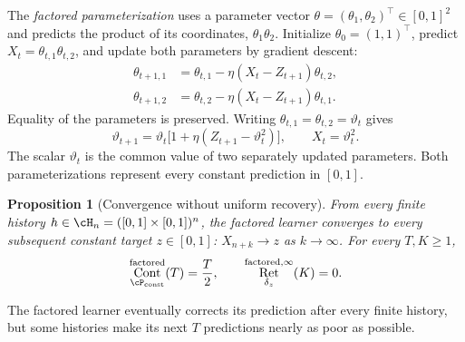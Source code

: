 \documentclass[11pt,twoside]{article}
\newtheorem{proposition}[theorem]{Proposition}
\theoremstyle{definition}
\theoremstyle{remark}
\DeclareMathOperator{\Cont}{Cont}
\DeclareMathOperator{\Ret}{Ret}
\begin{document}
The \emph{factored parameterization} uses a parameter vector
$\theta=(\theta_1,\theta_2)^\top\in[0,1]^2$ and predicts the product of its coordinates,
$\theta_1\theta_2$. Initialize $\theta_0=(1,1)^\top$,
predict $X_t=\theta_{t,1}\theta_{t,2}$, and update both parameters
by gradient descent:
\begin{equation}
 \begin{aligned}
 \theta_{t+1,1}
 &=\theta_{t,1}-\eta(X_t-Z_{t+1})\theta_{t,2},\\
 \theta_{t+1,2}
 &=\theta_{t,2}-\eta(X_t-Z_{t+1})\theta_{t,1}.
 \end{aligned}
 \label{eq:factored}
\end{equation}
Equality of the parameters is preserved. Writing
$\theta_{t,1}=\theta_{t,2}=\vartheta_t$ gives
\begin{equation}
 \vartheta_{t+1}
 =\vartheta_t\bigl[1+\eta(Z_{t+1}-\vartheta_t^2)\bigr],
 \qquad X_t=\vartheta_t^2.
 \label{eq:balanced}
\end{equation}
The scalar $\vartheta_t$ is the common value of two separately updated
parameters.
Both parameterizations represent every constant prediction in $[0,1]$.

\begin{proposition}[Convergence without uniform recovery]
\label{thm:factored}
\label{cor:separation}
From every finite history $h\in\cH_n=([0,1]\times[0,1])^n$, the factored
learner converges to every subsequent constant target $z\in[0,1]$:
$X_{n+k}\to z$ as $k\to\infty$. For every $T,K\ge1$,
\[
 \Cont_{\cP_{\rm const}}^{\rm factored}(T)=\frac T2,\qquad
 \Ret_{\delta_z}^{{\rm factored},\infty}(K)=0.
\]
\end{proposition}

The factored learner eventually corrects its prediction after every finite
history, but some histories make its next $T$ predictions nearly as poor
as possible.
\end{document}
